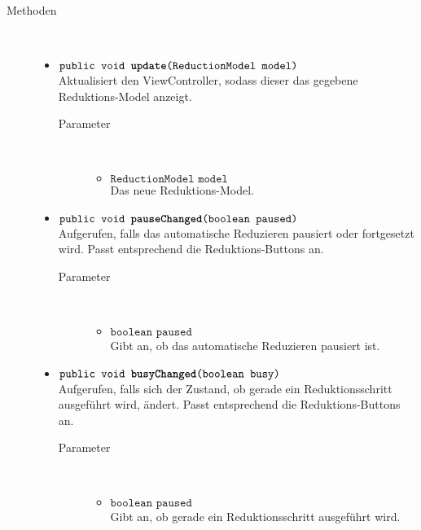 \begin{description}
\item[Methoden] \hfill \\
	\vspace{-.8cm}
	\begin{itemize}		
		\item $\texttt{public void \textbf{update}(ReductionModel model)}$ \\ Aktualisiert den ViewController, sodass dieser das gegebene Reduktions-Model anzeigt.
		\begin{description}
			\item[Parameter] \hfill \\
			\vspace{-.8cm}
			\begin{itemize}
				\item $\texttt{ReductionModel model}$ \\ Das neue Reduktions-Model.
			\end{itemize}
		\end{description}
		
		\item $\texttt{public void \textbf{pauseChanged}(boolean paused)}$ \\ Aufgerufen, falls das automatische Reduzieren pausiert oder fortgesetzt wird. Passt entsprechend die Reduktions-Buttons an.
		\begin{description}
			\item[Parameter] \hfill \\
			\vspace{-.8cm}
			\begin{itemize}
				\item $\texttt{boolean paused}$ \\ Gibt an, ob das automatische Reduzieren pausiert ist.
			\end{itemize}
		\end{description}
		
		\item $\texttt{public void \textbf{busyChanged}(boolean busy)}$ \\ Aufgerufen, falls sich der Zustand, ob gerade ein Reduktionsschritt ausgeführt wird, ändert. Passt entsprechend die Reduktions-Buttons an.
		\begin{description}
			\item[Parameter] \hfill \\
			\vspace{-.8cm}
			\begin{itemize}
				\item $\texttt{boolean paused}$ \\ Gibt an, ob gerade ein Reduktionsschritt ausgeführt wird.
			\end{itemize}
		\end{description}
		

\end{itemize}
\end{description}
